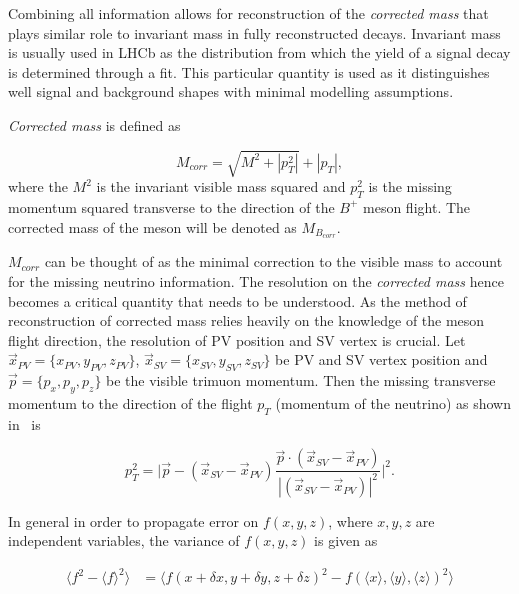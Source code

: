 Combining all information allows for reconstruction of the \emph{corrected mass} that plays similar role to invariant mass in fully reconstructed decays. Invariant mass is usually used in \gls{LHCb} as the distribution from which the yield of a signal decay is determined through a fit. This particular quantity is used as it distinguishes well signal and background shapes with minimal modelling assumptions.

\emph{Corrected mass} is defined as

\begin{equation}
	M_{corr} = \sqrt{{M}^{2} + |p^{2}_{T}|} + |p_{T}|,
\label{eq:corrm}        
\end{equation}	
where the $M^{2}$ is the invariant visible mass squared and $p^{2}_{T}$ is the missing momentum squared transverse to the direction of the $B^{+}$ meson flight. The corrected mass of the \Bpm meson will be denoted as $M_{B_{corr}}$.


$M_{corr}$ can be thought of as the minimal correction to the visible mass to account for the missing neutrino information. The resolution on the \textit{corrected mass} hence becomes a critical quantity that needs to be understood. As the method of reconstruction of corrected mass relies heavily on the knowledge of the \Bpm meson flight direction, the resolution of \gls{PV} position and \gls{SV} vertex is crucial. Let $\vec{{x}}_{PV}=\{x_{PV},y_{PV},z_{PV}\}$, $\vec{{x}}_{SV}=\{x_{SV},y_{SV},z_{SV}\} $ be \gls{PV} and \gls{SV} vertex position and $\vec{p}=\{p_{x},p_{y},p_{z}\}$ be the visible trimuon momentum. Then the missing transverse momentum to the direction of the flight $p_{T}$ (momentum of the neutrino) as shown in~\cite{Egede:1694339} is


\begin{equation}
	p^{2}_{T} = \Big|\vec{p} - (\vec{{x}}_{SV}-\vec{{x}}_{PV})\frac{\vec{p} \cdot(\vec{{x}}_{SV}-\vec{{x}}_{PV})}{|(\vec{{x}}_{SV}-\vec{{x}}_{PV})|^{2}}\Big|^{2}. 
\label{eq:ptmis}
\end{equation}



In general in order to propagate error on $f(x,y,z)$, where $x,y,z$ are independent variables, the variance of $f(x,y,z)$ is given as

\begin{equation}
\begin{aligned}
	\langle f^{2}-\langle f \rangle^{2} \rangle  &=  \langle f(x+\delta x, y+\delta y, z+\delta z)^{2} - f(\langle x \rangle, \langle y \rangle, \langle z \rangle)^{2} \rangle \\
\end{aligned}
\end{equation}

